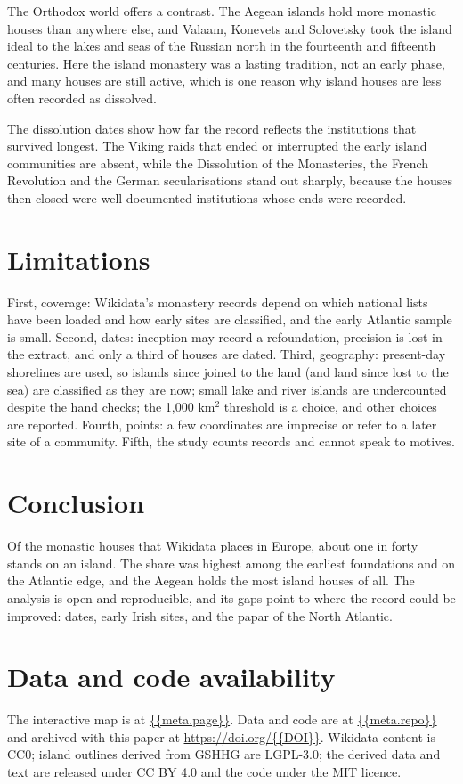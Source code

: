 \documentclass[11pt,a4paper]{article}
\begin{document}
The Orthodox world offers a contrast. The Aegean islands hold more monastic houses than anywhere else, and Valaam, Konevets and Solovetsky took the island ideal to the lakes and seas of the Russian north in the fourteenth and fifteenth centuries. Here the island monastery was a lasting tradition, not an early phase, and many houses are still active, which is one reason why island houses are less often recorded as dissolved.

The dissolution dates show how far the record reflects the institutions that survived longest. The Viking raids that ended or interrupted the early island communities are absent, while the Dissolution of the Monasteries, the French Revolution and the German secularisations stand out sharply, because the houses then closed were well documented institutions whose ends were recorded.

\section{Limitations}
First, coverage: Wikidata's monastery records depend on which national lists have been loaded and how early sites are classified, and the early Atlantic sample is small. Second, dates: inception may record a refoundation, precision is lost in the extract, and only a third of houses are dated. Third, geography: present-day shorelines are used, so islands since joined to the land (and land since lost to the sea) are classified as they are now; small lake and river islands are undercounted despite the hand checks; the 1,000 km$^2$ threshold is a choice, and other choices are reported. Fourth, points: a few coordinates are imprecise or refer to a later site of a community. Fifth, the study counts records and cannot speak to motives.

\section{Conclusion}
Of the monastic houses that Wikidata places in Europe, about one in forty stands on an island. The share was highest among the earliest foundations and on the Atlantic edge, and the Aegean holds the most island houses of all. The analysis is open and reproducible, and its gaps point to where the record could be improved: dates, early Irish sites, and the papar of the North Atlantic.

\section*{Data and code availability}
The interactive map is at \url{{{meta.page}}}. Data and code are at \url{{{meta.repo}}} and archived with this paper at \url{https://doi.org/{{DOI}}}. Wikidata content is CC0; island outlines derived from GSHHG are LGPL-3.0; the derived data and text are released under CC BY 4.0 and the code under the MIT licence.
\end{document}
